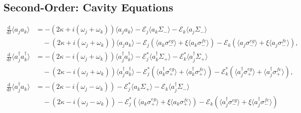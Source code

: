 \documentclass{article}
\newcommand{\ddt}{\frac{\mathrm{d}}{\mathrm{d}t}}
\begin{document}
\subsection{Second-Order: Cavity Equations}

\begin{subequations}
\begin{align}
	\ddt \langle a_{j} a_{k} \rangle &= -\left(2 \kappa + i \left( \omega_{j} + \omega_{k} \right) \right) \langle a_{j} a_{k} \rangle - \mathcal{E}_{j} \langle a_{k} \Sigma_{-} \rangle - \mathcal{E}_{k} \langle a_{j} \Sigma_{-} \rangle \nonumber \\
	&\quad -\left(2 \kappa + i \left( \omega_{j} + \omega_{k} \right) \right) \langle a_{j} a_{k} \rangle - \mathcal{E}_{j} \left( \langle a_{k} \sigma^{eg}_{-} \rangle + \xi \langle a_{k} \sigma^{fe}_{-} \rangle \right) - \mathcal{E}_{k} \left( \langle a_{j} \sigma^{eg}_{-} \rangle + \xi \langle a_{j} \sigma^{fe}_{-} \rangle \right), \\
	\ddt \langle a^{\dagger}_{j} a^{\dagger}_{k} \rangle &=  -\left(2 \kappa - i \left( \omega_{j} + \omega_{k} \right) \right) \langle a^{\dagger}_{j} a^{\dagger}_{k} \rangle - \mathcal{E}_{j}^{*} \langle a^{\dagger}_{k} \Sigma_{+} \rangle - \mathcal{E}_{k}^{*} \langle a^{\dagger}_{j} \Sigma_{+} \rangle \nonumber \\
	&\quad -\left(2 \kappa - i \left( \omega_{j} + \omega_{k} \right) \right) \langle a^{\dagger}_{j} a^{\dagger}_{k} \rangle - \mathcal{E}_{j}^{*} \left( \langle a^{\dagger}_{k} \sigma^{eg}_{+} \rangle + \langle a^{\dagger}_{k} \sigma^{fe}_{+} \rangle \right) - \mathcal{E}_{k}^{*} \left( \langle a^{\dagger}_{j} \sigma^{eg}_{+} \rangle + \langle a^{\dagger}_{j} \sigma^{fe}_{+} \rangle \right), \\
	\ddt \langle a^{\dagger}_{j} a_{k} \rangle &= -\left( 2\kappa - i \left( \omega_{j} - \omega_{k} \right) \right) - \mathcal{E}_{j}^{*} \langle a_{k} \Sigma_{+} \rangle - \mathcal{E}_{k} \langle a^{\dagger}_{j} \Sigma_{-} \rangle \nonumber \\
	&\quad -\left( 2\kappa - i \left( \omega_{j} - \omega_{k} \right) \right) - \mathcal{E}_{j}^{*} \left( \langle a_{k} \sigma^{eg}_{+} \rangle + \xi \langle a_{k} \sigma^{fe}_{+} \rangle \right)- \mathcal{E}_{k} \left( \langle a_{j}^{\dagger} \sigma^{eg}_{-} \rangle + \xi \langle a_{j}^{\dagger} \sigma^{fe}_{-} \rangle \right)
\end{align}
\end{subequations}
\end{document}

